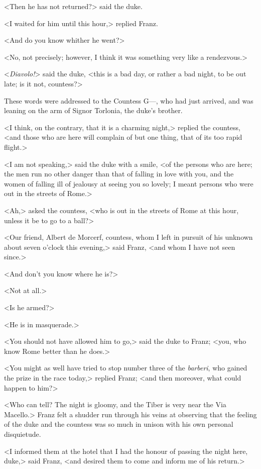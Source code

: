  <Then he has not returned?> said the duke. 

 <I waited for him until this hour,> replied Franz. 

 <And do you know whither he went?> 

 <No, not precisely; however, I think it was something very like a rendezvous.> 

 <\textit{Diavolo!}> said the duke, <this is a bad day, or rather a bad night, to be out late; is it not, countess?> 

 These words were addressed to the Countess G—, who had just arrived, and was leaning on the arm of Signor Torlonia, the duke's brother. 

 <I think, on the contrary, that it is a charming night,> replied the countess, <and those who are here will complain of but one thing, that of its too rapid flight.> 

 <I am not speaking,> said the duke with a smile, <of the persons who are here; the men run no other danger than that of falling in love with you, and the women of falling ill of jealousy at seeing you so lovely; I meant persons who were out in the streets of Rome.> 

 <Ah,> asked the countess, <who is out in the streets of Rome at this hour, unless it be to go to a ball?> 

 <Our friend, Albert de Morcerf, countess, whom I left in pursuit of his unknown about seven o'clock this evening,> said Franz, <and whom I have not seen since.> 

 <And don't you know where he is?> 

 <Not at all.> 

 <Is he armed?> 

 <He is in masquerade.> 

 <You should not have allowed him to go,> said the duke to Franz; <you, who know Rome better than he does.> 

 <You might as well have tried to stop number three of the \textit{barberi}, who gained the prize in the race today,> replied Franz; <and then moreover, what could happen to him?> 

 <Who can tell? The night is gloomy, and the Tiber is very near the Via Macello.> Franz felt a shudder run through his veins at observing that the feeling of the duke and the countess was so much in unison with his own personal disquietude. 

 <I informed them at the hotel that I had the honour of passing the night here, duke,> said Franz, <and desired them to come and inform me of his return.> 

